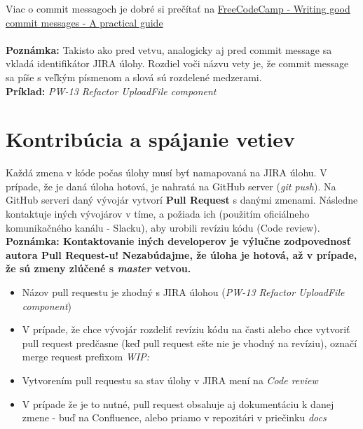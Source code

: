 \documentclass{article}
\begin{document}
            \noindent \textnormal{%
            Viac o commit messagoch je dobré si prečítať na
            \href{https://www.freecodecamp.org/news/writing-good-commit-messages-a-practical-guide/}{FreeCodeCamp - Writing good commit messages - A practical guide} \\\\
            \textbf{Poznámka:} Takisto ako pred vetvu, analogicky aj pred commit message sa vkladá identifikátor JIRA úlohy. Rozdiel voči názvu vety je, že commit message sa píše s veľkým písmenom a slová sú rozdelené medzerami. \\
            \textbf{Príklad:} \emph{PW-13 Refactor UploadFile component}
            }
    

    \pagebreak
    \section*{Kontribúcia a spájanie vetiev}

        Každá zmena v kóde počas úlohy musí byť namapovaná na JIRA úlohu.
        V prípade, že je daná úloha hotová, je nahratá na GitHub server (\emph{git push}).
        Na GitHub serveri daný vývojár vytvorí \textbf{Pull Request} s danými zmenami.
        Následne kontaktuje iných vývojárov v tíme, a požiada ich (použitím oficiálneho komunikačného kanálu - Slacku),
        aby urobili revíziu kódu (Code review). \\

        \noindent \textbf{Poznámka: Kontaktovanie iných developerov je výlučne zodpovednosť autora Pull Request-u! Nezabúdajme, že úloha je hotová, až v prípade, že sú zmeny zlúčené s \emph{master} vetvou.} \\

    \begin{itemize}
        \item Názov pull requestu je zhodný s JIRA úlohou (\emph{PW-13 Refactor UploadFile component})
        \item V prípade, že chce vývojár rozdeliť revíziu kódu na časti alebo chce vytvoriť pull request predčasne (keď pull request ešte nie je vhodný na revíziu), označí merge request prefixom \emph{WIP:}
        \item Vytvorením pull requestu sa stav úlohy v JIRA mení na \emph{Code review}
        \item V prípade že je to nutné, pull request obsahuje aj dokumentáciu k danej zmene - buď na Confluence, alebo priamo v repozitári v priečinku \emph{docs}
    \end{itemize}
\end{document}
